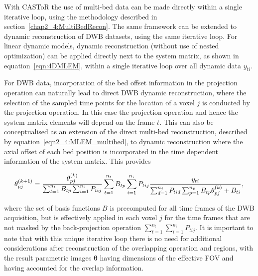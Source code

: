 With CASToR the use of multi-bed data can be made directly within a single iterative loop, using the methodology described in section~\ref{chap2_4:MultiBedRecon}. The same framework can be extended to dynamic reconstruction of DWB datasets, using the same iterative loop. 
For linear dynamic models, dynamic reconstruction (without use of nested optimization) can be applied directly next to the system matrix, as shown in equation~\ref{eqn:4DMLEM}, within a single iterative loop over all dynamic data $y_{ti}$. 

For DWB data, incorporation of the bed offset information in the projection operation can naturally lead to direct DWB dynamic reconstruction, where the selection of the sampled time points for the location of a voxel $j$ is conducted by the projection operation. In this case the projection operation and hence the system matrix elements will depend on the frame $t$. 
This can also be conceptualised as an extension of the direct multi-bed reconstruction, described by equation~\ref{eqn2_4:MLEM_multibed}, to dynamic reconstruction where the axial offset of each bed position is incorporated in the time dependent information of the system matrix.
This provides

\begin{equation}
\theta_{pj}^{(k+1)} = \frac{\theta_{pj}^{(k)}}
{\sum_{t=1}^{n_t} B_{tp} \sum_{i=1}^{n_i} P_{tij}} 
\sum_{t=1}^{n_t} B_{tp}  \sum_{i=1}^{n_i} P_{tij} 
\frac{y_{ti}}
{\sum_{d=1}^{n_j} P_{tid} \sum_{p=1}^{n_p} B_{tp}\theta_{pj}^{(k)} + B_{ti} } \\, \\
\label{eqn:4DMLEM_Multibed}
\end{equation} 

where the set of basis functions $B$ is precomputed for all time frames of the DWB acquisition, but is effectively applied in each voxel $j$ for the time frames that are not masked by the back-projection operation $\sum_{t=1}^{n_t} \sum_{i=1}^{n_i} P_{tij}$.
It is important to note that with this unique iterative loop there is no need for additional considerations after reconstruction of the overlapping operation and regions, with the result parametric images $\boldsymbol\theta$ having dimensions of the effective FOV and having accounted for the overlap information.

